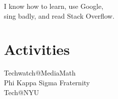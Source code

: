 \documentclass[]{two-column-resume}
\begin{document}
\begin{minipage}[t]{0.34\textwidth}
I know how to learn, use Google,\\
sing badly, and read Stack Overflow.

\sectionsep

\section{Activities}
Techwatch@MediaMath \\
Phi Kappa Sigma Fraternity \\
Tech@NYU \\
\sectionsep




\end{minipage} 
\hfill
\end{document}
